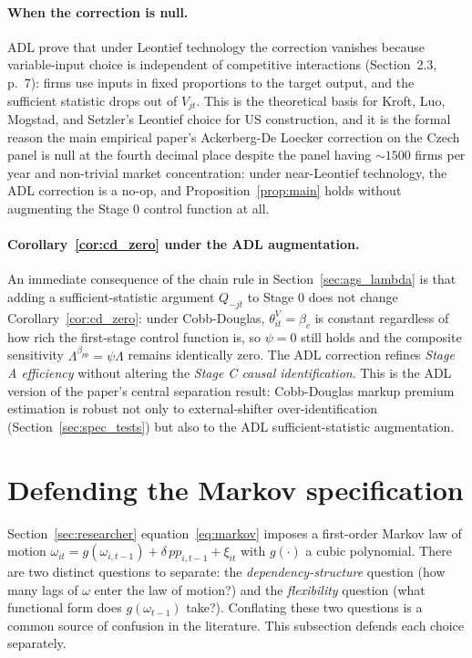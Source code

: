 \documentclass[11pt]{article}
\begin{document}
\paragraph{When the correction is null.} ADL prove that under Leontief technology the correction vanishes because variable-input choice is independent of competitive interactions (Section~2.3, p.~7): firms use inputs in fixed proportions to the target output, and the sufficient statistic drops out of $V_{jt}$. This is the theoretical basis for Kroft, Luo, Mogstad, and Setzler's \cite{KLMS2025} Leontief choice for US construction, and it is the formal reason the main empirical paper's Ackerberg-De Loecker correction on the Czech panel is null at the fourth decimal place despite the panel having $\sim 1500$ firms per year and non-trivial market concentration: under near-Leontief technology, the ADL correction is a no-op, and Proposition~\ref{prop:main} holds without augmenting the Stage 0 control function at all.

\paragraph{Corollary~\ref{cor:cd_zero} under the ADL augmentation.} An immediate consequence of the chain rule in Section~\ref{sec:ags_lambda} is that adding a sufficient-statistic argument $Q_{-jt}$ to Stage 0 does not change Corollary~\ref{cor:cd_zero}: under Cobb-Douglas, $\theta^V_{it} = \beta_c$ is constant regardless of how rich the first-stage control function is, so $\psi = 0$ still holds and the composite sensitivity $\Lambda^{\beta_{pp}} = \psi\Lambda$ remains identically zero. The ADL correction refines \emph{Stage A efficiency} without altering the \emph{Stage C causal identification}. This is the ADL version of the paper's central separation result: Cobb-Douglas markup premium estimation is robust not only to external-shifter over-identification (Section~\ref{sec:spec_tests}) but also to the ADL sufficient-statistic augmentation.

\section{Defending the Markov specification}\label{sec:markov}

Section~\ref{sec:researcher} equation~\eqref{eq:markov} imposes a first-order Markov law of motion $\omega_{it} = g(\omega_{i,t-1}) + \delta\, pp_{i,t-1} + \xi_{it}$ with $g(\cdot)$ a cubic polynomial. There are two distinct questions to separate: the \emph{dependency-structure} question (how many lags of $\omega$ enter the law of motion?) and the \emph{flexibility} question (what functional form does $g(\omega_{t-1})$ take?). Conflating these two questions is a common source of confusion in the literature. This subsection defends each choice separately.
\end{document}
